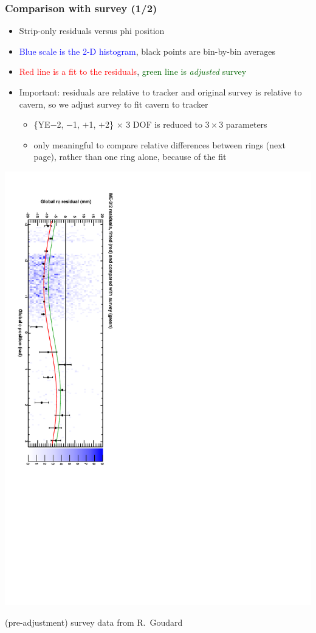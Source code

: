 \documentclass[compress]{beamer}
\begin{document}
\begin{frame}
\frametitle{Comparison with survey (1/2)}
\begin{itemize}
\item Strip-only residuals versus phi position
\item \textcolor{blue}{Blue scale is the 2-D histogram}, black points are bin-by-bin averages
\item \textcolor{red}{Red line is a fit to the residuals}, \textcolor{darkgreen}{green line is {\it adjusted} survey}
\item Important: residuals are relative to tracker and original survey
  is relative to cavern, so we adjust survey to fit cavern to tracker
\begin{itemize}
\item \{YE$-$2, $-$1, $+$1, $+$2\} $\times$ 3 DOF is reduced to $3\times 3$ parameters
\item only meaningful to compare relative differences between rings (next page), rather than one ring alone, because of the fit
\end{itemize}

\end{itemize}
\includegraphics[height=\linewidth, angle=90]{datacsc_survey_mem32.pdf}

\scriptsize \hfill (pre-adjustment) survey data from R.~Goudard
\end{frame}
\end{document}
